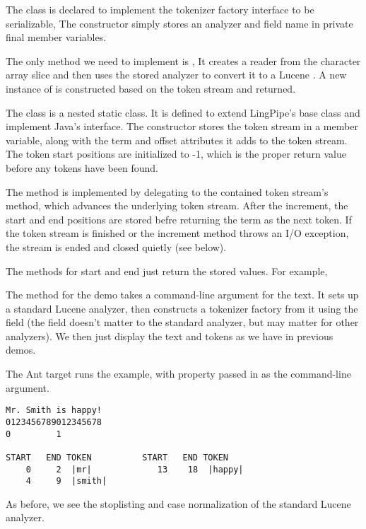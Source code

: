 The class is declared to implement the tokenizer factory interface to
be serializable,
%
%
The constructor simply stores an analyzer and field name in private
final member variables.

The only method we need to implement is ,
%
%
It creates a reader from the character array slice and then uses the
stored analyzer to convert it to a Lucene .  A
new instance of  is constructed based
on the token stream and returned.

The  class is a nested static class.
It is defined to extend LingPipe's  base class and
implement Java's  interface.
%
%
The constructor stores the token stream in a member variable, along
with the term and offset attributes it adds to the token stream.
The token start positions are initialized to -1, which is the proper
return value before any tokens have been found.

The  method is implemented by delegating to the
contained token stream's  method, which
advances the underlying token stream.  
%
After the increment, the start
and end positions are stored befre returning the term as the next
token.  If the token stream is finished or the increment method throws
an I/O exception, the stream is ended and closed quietly (see below).
%

The methods for start and end just return the stored
values.  For example,
%

The  method for the demo takes a command-line argument
for the text.  It sets up a standard Lucene analyzer, then constructs
a tokenizer factory from it using the field  (the field
doesn't matter to the standard analyzer, but may matter for other
analyzers).  
%
%
We then just display the text and tokens as we have in
previous demos.

The Ant target  runs the example, with
property  passed in as the command-line argument.
%
\begin{verbatim}
Mr. Smith is happy!
0123456789012345678
0         1

START   END TOKEN          START   END TOKEN
    0     2  |mr|             13    18  |happy|
    4     9  |smith|
\end{verbatim}
%
As before, we see the stoplisting and case normalization of
the standard Lucene analyzer.











